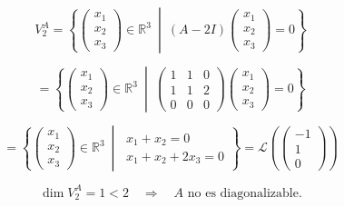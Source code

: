 \documentclass[12pt]{article}
\begin{document}
\begin{ejercicio}[2 puntos]
		\medskip
		
		
		\medskip
		
		
		\[
		V_2^A = \left\{
		\begin{pmatrix}
			x_1 \\
			x_2 \\
			x_3
		\end{pmatrix}
		\in \mathbb{R}^3 \ \middle| \ 
		(A - 2I)
		\begin{pmatrix}
			x_1 \\
			x_2 \\
			x_3
		\end{pmatrix}
		= 0
		\right\}
		\]
		
		\[
		= \left\{
		\begin{pmatrix}
			x_1 \\
			x_2 \\
			x_3
		\end{pmatrix}
		\in \mathbb{R}^3 \ \middle| \
		\begin{pmatrix}
			1 & 1 & 0 \\
			1 & 1 & 2 \\
			0 & 0 & 0
		\end{pmatrix}
		\begin{pmatrix}
			x_1 \\
			x_2 \\
			x_3
		\end{pmatrix}
		= 0
		\right\}
		\]
		
		\[
		= \left\{
		\begin{pmatrix}
			x_1 \\
			x_2 \\
			x_3
		\end{pmatrix}
		\in \mathbb{R}^3 \ \middle| \
		\begin{array}{l}
			x_1 + x_2 = 0 \\
			x_1 + x_2 + 2x_3 = 0
		\end{array}
		\right\}
		= \mathcal{L} \left( \begin{pmatrix} -1 \\ 1 \\ 0 \end{pmatrix} \right)
		\]
		
		\[
		\dim V_2^A = 1 < 2 \quad \Rightarrow \quad A \text{ no es diagonalizable.}
		\]
		
		\bigskip
		

\end{ejercicio}
\end{document}
